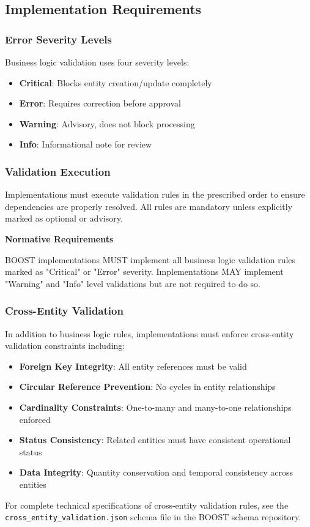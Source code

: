\subsection{Implementation Requirements}
\label{sec:implementation-requirements}

\subsubsection{Error Severity Levels}

Business logic validation uses four severity levels:

\begin{itemize}
    \item \textbf{Critical}: Blocks entity creation/update completely
    \item \textbf{Error}: Requires correction before approval
    \item \textbf{Warning}: Advisory, does not block processing
    \item \textbf{Info}: Informational note for review
\end{itemize}

\subsubsection{Validation Execution}

Implementations must execute validation rules in the prescribed order to ensure dependencies are properly resolved. All rules are mandatory unless explicitly marked as optional or advisory.

\textbf{Normative Requirements}

BOOST implementations MUST implement all business logic validation rules marked as "Critical" or "Error" severity. Implementations MAY implement "Warning" and "Info" level validations but are not required to do so.

\subsubsection{Cross-Entity Validation}

In addition to business logic rules, implementations must enforce cross-entity validation constraints including:

\begin{itemize}
    \item \textbf{Foreign Key Integrity}: All entity references must be valid
    \item \textbf{Circular Reference Prevention}: No cycles in entity relationships
    \item \textbf{Cardinality Constraints}: One-to-many and many-to-one relationships enforced
    \item \textbf{Status Consistency}: Related entities must have consistent operational status
    \item \textbf{Data Integrity}: Quantity conservation and temporal consistency across entities
\end{itemize}

For complete technical specifications of cross-entity validation rules, see the \texttt{cross\_entity\_validation.json} schema file in the BOOST schema repository.